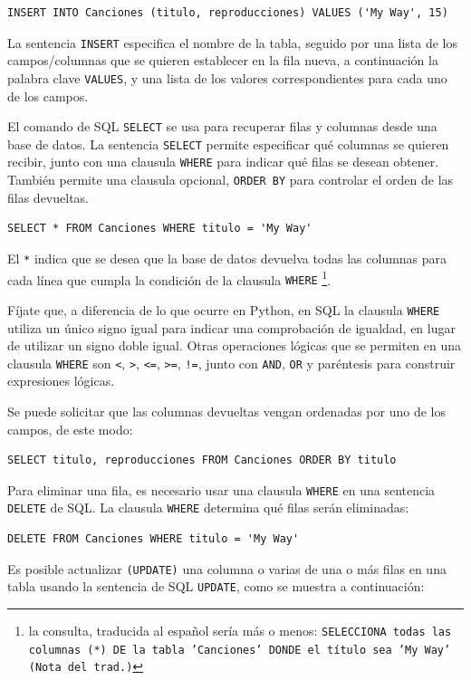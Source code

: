 \beforeverb
\begin{verbatim}
INSERT INTO Canciones (titulo, reproducciones) VALUES ('My Way', 15)
\end{verbatim}
\afterverb
%
La sentencia {\tt INSERT} especifica el nombre de la tabla, seguido por una lista
de los campos/columnas que se quieren establecer en la fila nueva, a continuación
la palabra clave {\tt VALUES}, y una lista de los valores correspondientes
para cada uno de los campos.

El comando de SQL {\tt SELECT} se usa para recuperar filas y columnas desde una base de datos.
La sentencia {\tt SELECT} permite especificar qué columnas se quieren
recibir, junto con una clausula {\tt WHERE} para indicar qué 
filas se desean obtener. También permite una clausula opcional,
{\tt ORDER BY} para controlar el orden de las filas devueltas.

\beforeverb
\begin{verbatim}
SELECT * FROM Canciones WHERE titulo = 'My Way'
\end{verbatim}
\afterverb
%
El \verb"*" indica que se desea que la base de datos devuelva todas las
columnas para cada línea que cumpla la condición de la clausula {\tt WHERE}
\footnote{la consulta, traducida al español sería más o menos:
{\tt SELECCIONA todas las columnas (*) DE la tabla 'Canciones' DONDE
el título sea 'My Way' (Nota del trad.)}}.

Fíjate que, a diferencia de lo que ocurre en Python, en SQL la clausula {\tt WHERE}
utiliza un único signo igual
para indicar una comprobación de igualdad, en lugar de utilizar un signo doble igual.
Otras operaciones lógicas que se permiten en una clausula {\tt WHERE} son
\verb"<",
\verb">",
\verb"<=",
\verb">=",
\verb"!=",
junto con {\tt AND}, {\tt OR} y paréntesis
para construir expresiones lógicas.

Se puede solicitar que las columnas devueltas vengan ordenadas por uno
de los campos, de este modo:

\beforeverb
\begin{verbatim}
SELECT titulo, reproducciones FROM Canciones ORDER BY titulo
\end{verbatim}
\afterverb
%
Para eliminar una fila, es necesario usar una clausula {\tt WHERE} en una sentencia
{\tt DELETE} de SQL. La clausula {\tt WHERE} determina qué filas serán eliminadas:

\beforeverb
\begin{verbatim}
DELETE FROM Canciones WHERE titulo = 'My Way'
\end{verbatim}
\afterverb
%
Es posible actualizar {\tt (UPDATE)} una columna o varias de una o más filas
en una tabla usando la sentencia de SQL {\tt UPDATE}, como se muestra a continuación:

